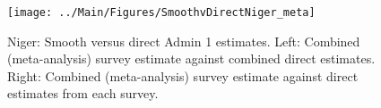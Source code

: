 \documentclass[12pt]{article}\usepackage[]{graphicx}\usepackage[]{color}
\newenvironment{knitrout}{}{} %
\begin{document}

\begin{knitrout}
\color{fgcolor}\begin{figure}[bht]

{\centering \texttt{[image: ../Main/Figures/SmoothvDirectNiger\_meta]} 

}

\caption[Niger]{Niger: Smooth versus direct Admin 1 estimates. Left: Combined (meta-analysis) survey estimate against combined direct estimates. Right: Combined (meta-analysis) survey estimate against direct estimates from each survey.}\label{fig:unnamed-chunk-253}
\end{figure}


\end{knitrout}
\end{document}
